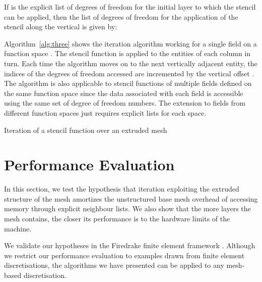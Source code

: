 \documentclass[11pt, a4paper]{scrartcl}
\begin{document}
If  is
the explicit list of degrees of freedom for the initial layer to which
the stencil can be applied, then the list of degrees of freedom for
the  application of the stencil along the vertical is
given by:


Algorithm~\ref{alg:three} shows the iteration algorithm working for a
single field  on a function space . The stencil
function  is applied to the entities of each column in turn. Each
time the algorithm moves on to the next vertically adjacent entity,
the indices of the degrees of freedom accessed are incremented by the
vertical offset . The algorithm is
also applicable to stencil functions of multiple fields defined on the
same function space since the data associated with each field is
accessible using the same set of degree of freedom numbers.  The
extension to fields from different function spaces just requires
explicit lists  for each space.

\begin{algorithm}[th]
\caption{Iteration of a stencil function over an extruded mesh}
\label{alg:three}
\begin{algorithmic}
		\STATE 
			\STATE 
				\STATE 
			\ENDFOR
		\ENDFOR
\ENDFOR
\end{algorithmic}
\end{algorithm}

\section{Performance Evaluation}
\label{sec:performance-evaluation}

In this section, we test the hypothesis that iteration exploiting the
extruded structure of the mesh amortizes the unstructured base mesh
overhead of accessing memory through explicit neighbour lists. We also
show that the more layers the mesh contains, the closer its
performance is to the hardware limits of the machine.

We validate our hypotheses in the Firedrake finite element framework
\citep{Rathgeber:2016}. Although we restrict our performance evaluation
to examples drawn from finite element discretisations, the algorithms
we have presented can be applied to any mesh-based discretisation.
\end{document}
